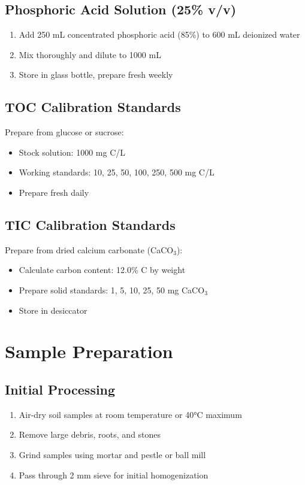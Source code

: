\documentclass[11pt,a4paper]{article}\usepackage[]{graphicx}\usepackage[]{xcolor}
\begin{document}
\subsection{Phosphoric Acid Solution (25\% v/v)}
\begin{enumerate}[noitemsep]
    \item Add 250 mL concentrated phosphoric acid (85\%) to 600 mL deionized water
    \item Mix thoroughly and dilute to 1000 mL
    \item Store in glass bottle, prepare fresh weekly
\end{enumerate}

\subsection{TOC Calibration Standards}
Prepare from glucose or sucrose:
\begin{itemize}[noitemsep]
    \item Stock solution: 1000 mg C/L
    \item Working standards: 10, 25, 50, 100, 250, 500 mg C/L
    \item Prepare fresh daily
\end{itemize}

\subsection{TIC Calibration Standards}
Prepare from dried calcium carbonate (CaCO$_3$):
\begin{itemize}[noitemsep]
    \item Calculate carbon content: 12.0\% C by weight
    \item Prepare solid standards: 1, 5, 10, 25, 50 mg CaCO$_3$
    \item Store in desiccator
\end{itemize}

\section{Sample Preparation}

\subsection{Initial Processing}
\begin{enumerate}[noitemsep]
    \item Air-dry soil samples at room temperature or 40°C maximum
    \item Remove large debris, roots, and stones
    \item Grind samples using mortar and pestle or ball mill
    \item Pass through 2 mm sieve for initial homogenization
\end{enumerate}
\end{document}
